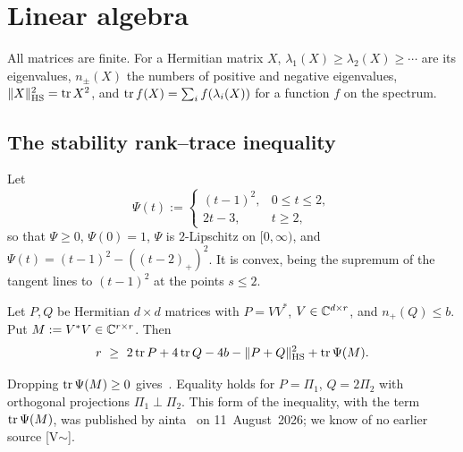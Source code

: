 \section{Linear algebra}\label{sec:linalg}

All matrices are finite. For a Hermitian matrix $X$, $\lambda_1(X)\ge\lambda_2(X)\ge\cdots$ are its eigenvalues, $n_\pm(X)$ the numbers of positive
and negative eigenvalues, $\lVert X\rVert_{\mathrm{HS}}^2=\operatorname{tr} X^2$, and $\operatorname{tr} f(X)=\sum_if(\lambda_i(X))$ for a function $f$ on the spectrum.

\subsection{The stability rank--trace inequality}
Let
\begin{equation}\label{eq:Psi}
\Psi(t):=\begin{cases}(t-1)^2,&0\le t\le2,\\ 2t-3,&t\ge2,\end{cases}
\end{equation}
so that $\Psi\ge0$, $\Psi(0)=1$, $\Psi$ is $2$-Lipschitz on $[0,\infty)$, and $\Psi(t)=(t-1)^2-((t-2)_+)^2$. It is convex, being the supremum of
the tangent lines to $(t-1)^2$ at the points $s\le2$.

\begin{lemma}\label{lem:stab}
Let $P,Q$ be Hermitian $d\times d$ matrices with $P=VV^*$, $V\in\mathbb C^{d\times r}$, and $n_+(Q)\le b$. Put $M:=V^*V\in\mathbb C^{r\times r}$. Then
\begin{equation}\label{eq:stab}
r\ \ge\ 2\operatorname{tr} P+4\operatorname{tr} Q-4b-\lVert P+Q\rVert_{\mathrm{HS}}^2+\operatorname{tr}\Psi(M).
\end{equation}
\end{lemma}

Dropping $\operatorname{tr}\Psi(M)\ge0$ gives~\cite[Lemma~3.2]{AF}. Equality holds for $P=\Pi_1$, $Q=2\Pi_2$ with orthogonal projections $\Pi_1\perp\Pi_2$.
This form of the inequality, with the term $\operatorname{tr}\Psi(M)$, was published by \mbox{ainta}~\cite{ainta} on 11~August~2026; we know of no earlier
source [V$\sim$].

